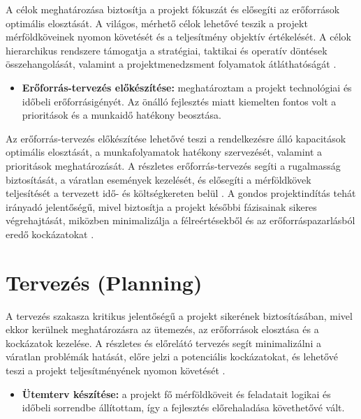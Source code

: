 A célok meghatározása biztosítja a projekt fókuszát és elősegíti az erőforrások optimális elosztását. 
A világos, mérhető célok lehetővé teszik a projekt mérföldköveinek nyomon követését és a teljesítmény objektív értékelését. 
A célok hierarchikus rendszere támogatja a stratégiai, taktikai és operatív döntések összehangolását, valamint a projektmenedzsment folyamatok átláthatóságát \cite{Hajdu2014,Szalay2018}.

\begin{itemize}
    \item \textbf{Erőforrás-tervezés előkészítése:} meghatároztam a projekt technológiai és időbeli erőforrásigényét. 
    Az önálló fejlesztés miatt kiemelten fontos volt a prioritások és a munkaidő hatékony beosztása.
\end{itemize}

Az erőforrás-tervezés előkészítése lehetővé teszi a rendelkezésre álló kapacitások optimális elosztását, 
a munkafolyamatok hatékony szervezését, valamint a prioritások meghatározását. 
A részletes erőforrás-tervezés segíti a rugalmasság biztosítását, a váratlan események kezelését, 
és elősegíti a mérföldkövek teljesítését a tervezett idő- és költségkereten belül \cite{Kovacs2016,Kaposi2019,Hajdu2014}.
A gondos projektindítás tehát irányadó jelentőségű, mivel biztosítja a projekt későbbi fázisainak sikeres végrehajtását, 
miközben minimalizálja a félreértésekből és az erőforráspazarlásból eredő kockázatokat \cite{Szalay2018}.


\section{Tervezés (Planning)}

A tervezés szakasza kritikus jelentőségű a projekt sikerének biztosításában, mivel ekkor kerülnek meghatározásra az ütemezés, az erőforrások elosztása és a kockázatok kezelése. 
A részletes és előrelátó tervezés segít minimalizálni a váratlan problémák hatását, előre jelzi a potenciális kockázatokat, 
és lehetővé teszi a projekt teljesítményének nyomon követését \cite{Hajdu2014,Szalay2018,Kovacs2016,Kaposi2019}.

\begin{itemize}
    \item \textbf{Ütemterv készítése:} a projekt fő mérföldköveit és feladatait logikai és időbeli sorrendbe állítottam, így a fejlesztés előrehaladása követhetővé vált.
\end{itemize}

